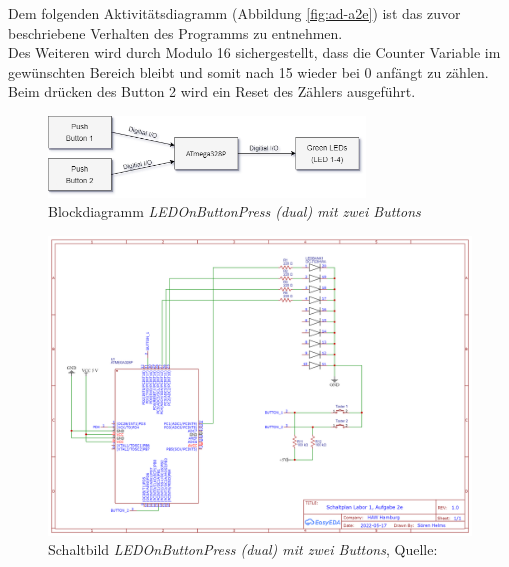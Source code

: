 \documentclass{article}
\begin{document}
\noindent Dem folgenden Aktivitätsdiagramm (Abbildung \ref{fig:ad-a2e}) ist das zuvor beschriebene Verhalten des Programms zu entnehmen. 
\\Des Weiteren wird durch Modulo 16 sichergestellt, dass die Counter Variable im gewünschten Bereich bleibt und somit nach 15 wieder bei 0 anfängt zu zählen.
\\Beim drücken des Button 2 wird ein Reset des Zählers ausgeführt.\\

\begin{figure}[!htb]
    \centering
    \includegraphics[width=0.75\textwidth]{images/A2e-BD-LEDOnButtonPressmitErweiterungumButton2dual.d.png}
    \caption{Blockdiagramm \textit{LEDOnButtonPress (dual) mit zwei Buttons}}
    \label{fig:bd-a2e}
\end{figure}

\begin{figure}[htb]
    \centering
    \includegraphics[width=\textwidth]{images/A2e-Schaltbild.png}
    \caption{Schaltbild \textit{LEDOnButtonPress (dual) mit zwei Buttons}, Quelle: \cite{SchaltbilderS}}
    \label{fig:sb-a2e}
\end{figure}
\end{document}
